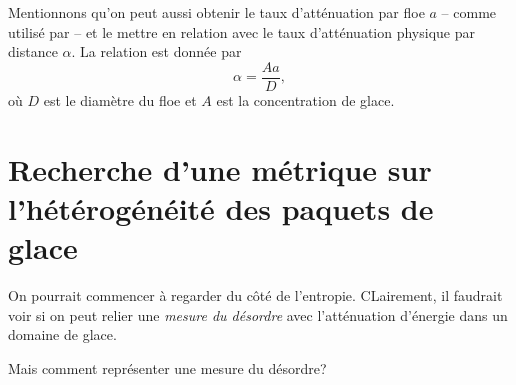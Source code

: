 \documentclass[10pt]{article}
\numberwithin{equation}{section}
\begin{document}
Mentionnons qu'on peut aussi obtenir le taux d'atténuation par floe \(a\) -- comme utilisé par \Textcite{Kohout2011wave} -- et le mettre en relation avec le taux d'atténuation physique par distance \(\alpha\). 
La relation est donnée par
\begin{equation}
   \alpha = \frac{A a}{D},
\end{equation}
où \(D\) est le diamètre du floe et \(A\) est la concentration de glace.
\section{Recherche d'une métrique sur l'hétérogénéité des paquets de glace}
\label{sec:org2423729}

On pourrait commencer à regarder du côté de l'entropie.
CLairement, il faudrait voir si on peut relier une \emph{mesure du désordre} avec l'atténuation d'énergie dans un domaine de glace.

Mais comment représenter une mesure du désordre?











\printbibliography
\end{document}
